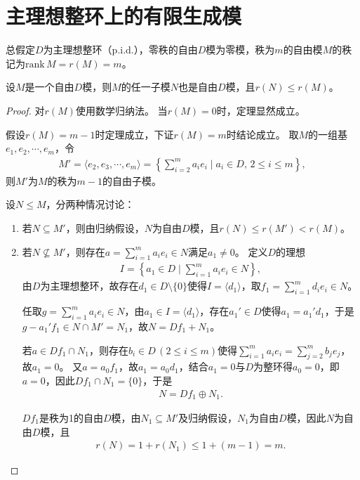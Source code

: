 \documentclass[../../main.tex]{subfiles}%
\begin{document}
\section{主理想整环上的有限生成模}

总假定$D$为主理想整环（p.i.d.），零秩的自由$D$模为零模，秩为$m$的自由模$M$的秩记为$\mathrm{rank}\,M=r(M)=m$。

\begin{theorem}
设$M$是一个自由$D$模，则$M$的任一子模$N$也是自由$D$模，且$r(N)\leqslant r(M)$。
\end{theorem}
\begin{proof}
对$r(M)$使用数学归纳法。
当$r(M)=0$时，定理显然成立。

假设$r(M)=m-1$时定理成立，下证$r(M)=m$时结论成立。
取$M$的一组基$e_1,e_2,\cdots,e_m$，令
\begin{align*}
M'=\langle e_2,e_3,\cdots,e_m\rangle=\left\{\sum_{i=2}^{m}a_ie_i\mid a_i\in D,\,2\leqslant i\leqslant m\right\},
\end{align*}
则$M'$为$M$的秩为$m-1$的自由子模。

设$N\leqslant M$，分两种情况讨论：
\begin{enumerate}[(1)]
\item 若$N\subseteq M'$，则由归纳假设，$N$为自由$D$模，且$r(N)\leqslant r(M')<r(M)$。
\item 若$N\nsubseteq M'$，则存在$a=\sum_{i=1}^{m}a_ie_i\in N$满足$a_1\neq0$。
定义$D$的理想
\begin{align*}
I=\left\{a_1\in D\mid \sum_{i=1}^{m}a_ie_i\in N\right\},
\end{align*}
由$D$为主理想整环，故存在$d_1\in D\setminus\{0\}$使得$I=\langle d_1\rangle$，取$f_1=\sum_{i=1}^{m}d_ie_i\in N$。

任取$g=\sum_{i=1}^{m}a_ie_i\in N$，由$a_1\in I=\langle d_1\rangle$，存在$a_1'\in D$使得$a_1=a_1'd_1$，于是$g-a_1'f_1\in N\cap M'=N_1$，故$N=Df_1+N_1$。

若$a\in Df_1\cap N_1$，则存在$b_i\in D\,(2\leqslant i\leqslant m)$使得$\sum_{i=1}^{m}a_ie_i=\sum_{j=2}^{m}b_je_j$，故$a_1=0$。
又$a=a_0f_1$，故$a_1=a_0d_1$，结合$a_1=0$与$D$为整环得$a_0=0$，即$a=0$，因此$Df_1\cap N_1=\{0\}$，于是
\begin{align*}
N=Df_1\oplus N_1.
\end{align*}

$Df_1$是秩为1的自由$D$模，由$N_1\subseteq M'$及归纳假设，$N_1$为自由$D$模，因此$N$为自由$D$模，且
\begin{align*}
r(N)=1+r(N_1)\leqslant1+(m-1)=m.
\end{align*}
\end{enumerate}
\end{proof}
\end{document}

